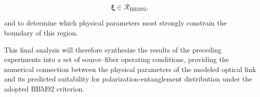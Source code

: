 \begin{equation}
\boldsymbol{\xi}
\in
\mathcal{R}_{\mathrm{BBM92}},
\end{equation}

and to determine which physical parameters most strongly constrain the boundary
of this region.

This final analysis will therefore synthesize the results of the preceding
experiments into a set of source--fiber operating conditions, providing the
numerical connection between the physical parameters of the modeled optical link
and its predicted suitability for polarization-entanglement distribution under
the adopted BBM92 criterion.

% 